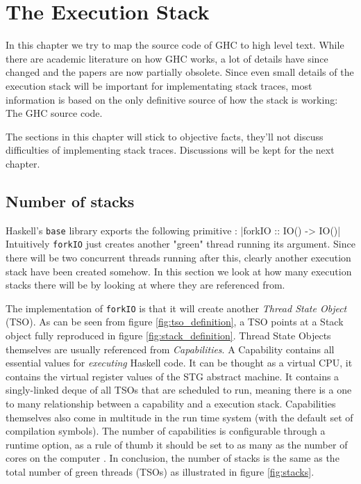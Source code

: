 \chapter{The Execution Stack}

In this chapter we try to map the source code of GHC to high level text.
While there are academic literature on how GHC works, a lot of details have
since changed and the papers are now partially obsolete. Since even
small details of the execution stack will be important for implementating stack traces,
most information is based on the only definitive source of how the
stack is working: The GHC source code.

The sections in this chapter will stick to objective facts,
they'll not discuss difficulties of implementing stack traces.
Discussions will be kept for the next chapter.

\section{Number of stacks}

Haskell's \texttt{base} library exports the following primitive \cite{base_forkIO}:
|forkIO :: IO() -> IO()|
Intuitively \texttt{forkIO} just creates another "green" thread running its argument.
Since there will be two concurrent threads running after this, clearly
another execution stack have been created somehow. In this section we
look at how many execution stacks there will be by looking at
where they are referenced from.

The implementation of \texttt{forkIO} is
that it will create another \emph{Thread State Object} (TSO). As
can be seen from figure \ref{fig:tso_definition}, a TSO points at a
Stack object fully reproduced in figure \ref{fig:stack_definition}.
Thread State Objects themselves are usually referenced from \emph{Capabilities}.
A Capability contains all essential values for \emph{executing}
Haskell code. It can be thought as a virtual CPU, it contains
the virtual register values of the STG abstract machine. It contains
a singly-linked deque of all TSOs that are scheduled to run, meaning
there is a one to many relationship between a capability and a execution
stack. Capabilities themselves also come in multitude in the run time
system (with the default set of compilation symbols). The number of
capabilities is configurable through a runtime option, as a rule of
thumb it should be set to as many as the number of cores on the computer
\cite{commentary_capabilities}. In conclusion, the number of stacks is
the same as the total number of green threads (TSOs) as illustrated in
figure \ref{fig:stacks}.

